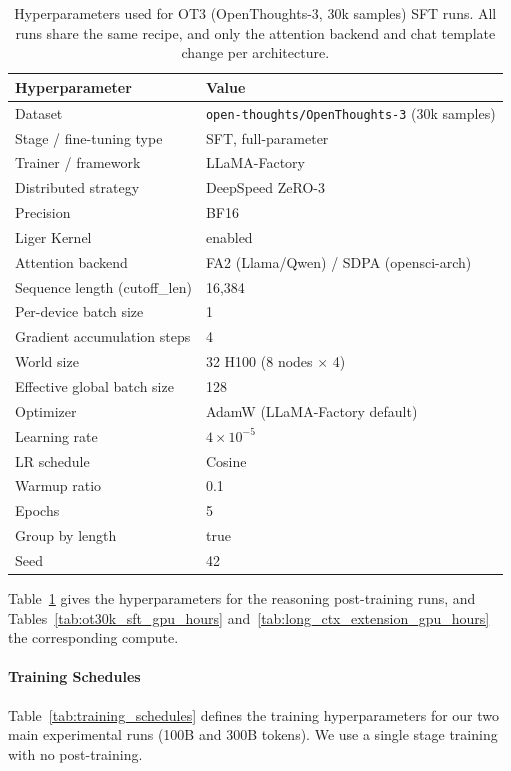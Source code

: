 \begin{table}[htbp]
\centering
\caption{Hyperparameters used for OT3 (OpenThoughts-3, 30k samples) SFT runs.
All runs share the same recipe, and only the attention backend and chat template change per architecture.}
\label{tab:ot30k_sft_hyperparams}
\begin{tabular}{ll}
\toprule
Hyperparameter & Value \\
\midrule
Dataset                       & \texttt{open-thoughts/OpenThoughts-3} (30k samples) \\
Stage / fine-tuning type      & SFT, full-parameter \\
Trainer / framework           & LLaMA-Factory \\
Distributed strategy          & DeepSpeed ZeRO-3 \\
Precision                     & BF16 \\
Liger Kernel                  & enabled \\
Attention backend             & FA2 (Llama/Qwen) / SDPA (opensci-arch) \\
\addlinespace
Sequence length (cutoff\_len) & 16{,}384 \\
Per-device batch size         & 1 \\
Gradient accumulation steps   & 4 \\
World size                    & 32 H100 (8 nodes $\times$ 4) \\
Effective global batch size   & 128 \\
\addlinespace
Optimizer                     & AdamW (LLaMA-Factory default) \\
Learning rate                 & $4 \times 10^{-5}$ \\
LR schedule                   & Cosine \\
Warmup ratio                  & 0.1 \\
Epochs                        & 5 \\
Group by length               & true \\
Seed                          & 42 \\
\bottomrule
\end{tabular}
\end{table}

Table~\ref{tab:ot30k_sft_hyperparams} gives the hyperparameters for the reasoning post-training runs, and Tables~\ref{tab:ot30k_sft_gpu_hours} and~\ref{tab:long_ctx_extension_gpu_hours} the corresponding compute.


\paragraph{Training Schedules}
Table~\ref{tab:training_schedules} defines the training hyperparameters for our two main experimental runs (100B and 300B tokens). We use a single stage training with no post-training.

